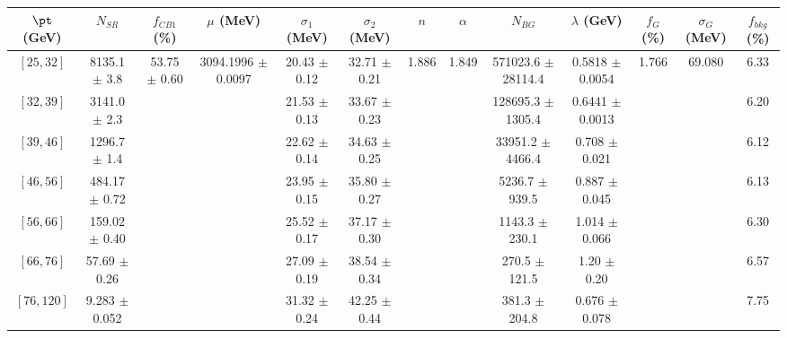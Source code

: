 \begin{tabular}{c||c|c|c|c|c|c|c|c|c|c|c||c}
$\pt$ (GeV) & $N_{SR}$ & $f_{CB1}$ (\%) & $\mu$ (MeV) & $\sigma_1$ (MeV) & $\sigma_2$ (MeV) & $n$ & $\alpha$ & $N_{BG}$ & $\lambda$ (GeV) & $f_G$ (\%) & $\sigma_G$ (MeV) & $f_{bkg}$ (\%) \\
\hline
$[25, 32]$ & 8135.1 $\pm$ 3.8 & \multirow{7}{*}{53.75 $\pm$ 0.60} & \multirow{7}{*}{3094.1996 $\pm$ 0.0097} & 20.43 $\pm$ 0.12 & 32.71 $\pm$ 0.21 & \multirow{7}{*}{1.886} & \multirow{7}{*}{1.849} & 571023.6 $\pm$ 28114.4 & 0.5818 $\pm$ 0.0054 & \multirow{7}{*}{1.766} & \multirow{7}{*}{69.080} & 6.33\\
$[32, 39]$ & 3141.0 $\pm$ 2.3 &  &  & 21.53 $\pm$ 0.13 & 33.67 $\pm$ 0.23 &  &  & 128695.3 $\pm$ 1305.4 & 0.6441 $\pm$ 0.0013 &  &  & 6.20\\
$[39, 46]$ & 1296.7 $\pm$ 1.4 &  &  & 22.62 $\pm$ 0.14 & 34.63 $\pm$ 0.25 &  &  & 33951.2 $\pm$ 4466.4 & 0.708 $\pm$ 0.021 &  &  & 6.12\\
$[46, 56]$ & 484.17 $\pm$ 0.72 &  &  & 23.95 $\pm$ 0.15 & 35.80 $\pm$ 0.27 &  &  & 5236.7 $\pm$ 939.5 & 0.887 $\pm$ 0.045 &  &  & 6.13\\
$[56, 66]$ & 159.02 $\pm$ 0.40 &  &  & 25.52 $\pm$ 0.17 & 37.17 $\pm$ 0.30 &  &  & 1143.3 $\pm$ 230.1 & 1.014 $\pm$ 0.066 &  &  & 6.30\\
$[66, 76]$ & 57.69 $\pm$ 0.26 &  &  & 27.09 $\pm$ 0.19 & 38.54 $\pm$ 0.34 &  &  & 270.5 $\pm$ 121.5 & 1.20 $\pm$ 0.20 &  &  & 6.57\\
$[76, 120]$ & 9.283 $\pm$ 0.052 &  &  & 31.32 $\pm$ 0.24 & 42.25 $\pm$ 0.44 &  &  & 381.3 $\pm$ 204.8 & 0.676 $\pm$ 0.078 &  &  & 7.75\\
\end{tabular}
